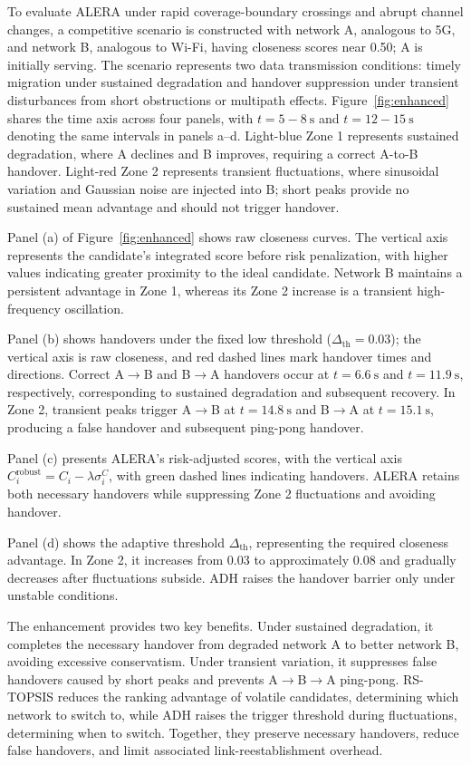\documentclass[preprint,12pt]{elsarticle}
\begin{document}
To evaluate ALERA under rapid coverage-boundary crossings and abrupt channel changes, a competitive scenario is constructed with network A, analogous to 5G, and network B, analogous to Wi-Fi, having closeness scores near 0.50; A is initially serving. The scenario represents two data transmission conditions: timely migration under sustained degradation and handover suppression under transient disturbances from short obstructions or multipath effects. Figure~\ref{fig:enhanced} shares the time axis across four panels, with $t=5-8~\mathrm{s}$ and $t=12-15~\mathrm{s}$ denoting the same intervals in panels a--d. Light-blue Zone 1 represents sustained degradation, where A declines and B improves, requiring a correct A-to-B handover. Light-red Zone 2 represents transient fluctuations, where sinusoidal variation and Gaussian noise are injected into B; short peaks provide no sustained mean advantage and should not trigger handover.

Panel (a) of Figure~\ref{fig:enhanced} shows raw closeness curves. The vertical axis represents the candidate's integrated score before risk penalization, with higher values indicating greater proximity to the ideal candidate. Network B maintains a persistent advantage in Zone 1, whereas its Zone 2 increase is a transient high-frequency oscillation.

Panel (b) shows handovers under the fixed low threshold ($\Delta_{\mathrm{th}}=0.03$); the vertical axis is raw closeness, and red dashed lines mark handover times and directions. Correct A$\rightarrow$B and B$\rightarrow$A handovers occur at $t=6.6~\mathrm{s}$ and $t=11.9~\mathrm{s}$, respectively, corresponding to sustained degradation and subsequent recovery. In Zone 2, transient peaks trigger A$\rightarrow$B at $t=14.8~\mathrm{s}$ and B$\rightarrow$A at $t=15.1~\mathrm{s}$, producing a false handover and subsequent ping-pong handover.

Panel (c) presents ALERA's risk-adjusted scores, with the vertical axis $C_i^{\mathrm{robust}}=C_i-\lambda\sigma_i^C$, with green dashed lines indicating handovers. ALERA retains both necessary handovers while suppressing Zone 2 fluctuations and avoiding handover.

Panel (d) shows the adaptive threshold $\Delta_{\mathrm{th}}$, representing the required closeness advantage. In Zone 2, it increases from 0.03 to approximately 0.08 and gradually decreases after fluctuations subside. ADH raises the handover barrier only under unstable conditions.

The enhancement provides two key benefits. Under sustained degradation, it completes the necessary handover from degraded network A to better network B, avoiding excessive conservatism. Under transient variation, it suppresses false handovers caused by short peaks and prevents A$\rightarrow$B$\rightarrow$A ping-pong. RS-TOPSIS reduces the ranking advantage of volatile candidates, determining which network to switch to, while ADH raises the trigger threshold during fluctuations, determining when to switch. Together, they preserve necessary handovers, reduce false handovers, and limit associated link-reestablishment overhead.
\end{document}
